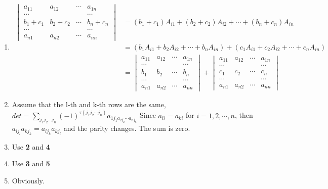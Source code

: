 \documentclass{article}
\theoremstyle{definition}
\begin{document}
\begin{enumerate}
\item
\begin{align*}
\begin{vmatrix}
    a_{11} & a_{12} & \cdots & a_{1n}\\
    \cdots &  &  & \cdots\\
    b_{1}+c_{1} & b_{2}+c_{2} & \cdots & b_{n}+c_{n}\\
    \cdots &  &  & \cdots\\
    a_{n1} & a_{n2} & \cdots & a_{nn}
\end{vmatrix}
& = (b_{1}+c_{1})A_{i1} + (b_{2}+c_{2})A_{i2} + \cdots + (b_{n}+c_{n})A_{in} \\
& = (b_{1}A_{i1} + b_{2}A_{i2} + \cdots + b_{n}A_{in}) + (c_{1}A_{i1} + c_{2}A_{i2} + \cdots + c_{n}A_{in}) \\
& = \begin{vmatrix}
    a_{11} & a_{12} & \cdots & a_{1n}\\
    \cdots &  &  & \cdots\\
    b_{1} & b_{2} & \cdots & b_{n}\\
    \cdots &  &  & \cdots\\
    a_{n1} & a_{n2} & \cdots & a_{nn}
\end{vmatrix}
+ \begin{vmatrix}
    a_{11} & a_{12} & \cdots & a_{1n}\\
    \cdots &  &  & \cdots\\
    c_{1} & c_{2} & \cdots & c_{n}\\
    \cdots &  &  & \cdots\\
    a_{n1} & a_{n2} & \cdots & a_{nn}
\end{vmatrix}
\end{align*}

\item    Assume that the l-th and k-th rows are the same,
$det = \sum_{j_{1}j_{2}\cdots j_{n}}(-1)^{\tau (j_{1}j_{2}\cdots j_{n})}a_{1j_{1}a_{2j_{2}}\cdots a_{nj_{n}}}$
Since $a_{li}=a_{ki}$ for $i=1,2,\cdots,n$, then $a_{lj_{l}}a_{kj_{k}}=a_{lj_{k}}a_{kj_{l}}$ and the parity changes.
The sum is zero.
\item 
Use \textbf{2} and \textbf{4}

\item 
Use \textbf{3} and \textbf{5}

\item Obviously.

\end{enumerate}
\end{document}

